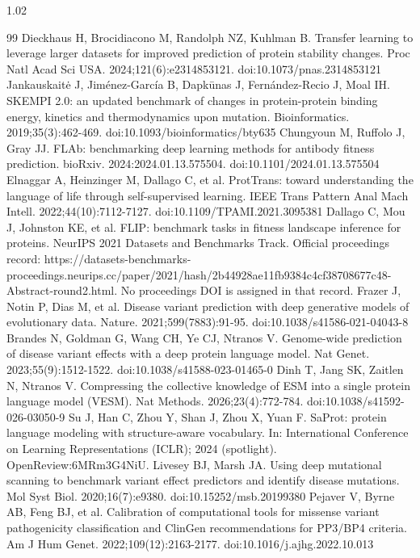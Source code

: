 \documentclass[12pt]{article}
\begin{document}
\begin{spacing}{1.02}
\begin{thebibliography}{99}
 Dieckhaus H, Brocidiacono M, Randolph NZ, Kuhlman B. Transfer learning to leverage larger datasets for improved prediction of protein stability changes. Proc Natl Acad Sci USA. 2024;121(6):e2314853121. doi:10.1073/pnas.2314853121
 Jankauskaitė J, Jiménez-García B, Dapkūnas J, Fernández-Recio J, Moal IH. SKEMPI 2.0: an updated benchmark of changes in protein-protein binding energy, kinetics and thermodynamics upon mutation. Bioinformatics. 2019;35(3):462-469. doi:10.1093/bioinformatics/bty635
 Chungyoun M, Ruffolo J, Gray JJ. FLAb: benchmarking deep learning methods for antibody fitness prediction. bioRxiv. 2024:2024.01.13.575504. doi:10.1101/2024.01.13.575504
 Elnaggar A, Heinzinger M, Dallago C, et al. ProtTrans: toward understanding the language of life through self-supervised learning. IEEE Trans Pattern Anal Mach Intell. 2022;44(10):7112-7127. doi:10.1109/TPAMI.2021.3095381
 Dallago C, Mou J, Johnston KE, et al. FLIP: benchmark tasks in fitness landscape inference for proteins. NeurIPS 2021 Datasets and Benchmarks Track. Official proceedings record: https://datasets-benchmarks-proceedings.neurips.cc/paper/2021/hash/2b44928ae11fb9384c4cf38708677c48-Abstract-round2.html. No proceedings DOI is assigned in that record.
 Frazer J, Notin P, Dias M, et al. Disease variant prediction with deep generative models of evolutionary data. Nature. 2021;599(7883):91-95. doi:10.1038/s41586-021-04043-8
 Brandes N, Goldman G, Wang CH, Ye CJ, Ntranos V. Genome-wide prediction of disease variant effects with a deep protein language model. Nat Genet. 2023;55(9):1512-1522. doi:10.1038/s41588-023-01465-0
 Dinh T, Jang SK, Zaitlen N, Ntranos V. Compressing the collective knowledge of ESM into a single protein language model (VESM). Nat Methods. 2026;23(4):772-784. doi:10.1038/s41592-026-03050-9
 Su J, Han C, Zhou Y, Shan J, Zhou X, Yuan F. SaProt: protein language modeling with structure-aware vocabulary. In: International Conference on Learning Representations (ICLR); 2024 (spotlight). OpenReview:6MRm3G4NiU.
 Livesey BJ, Marsh JA. Using deep mutational scanning to benchmark variant effect predictors and identify disease mutations. Mol Syst Biol. 2020;16(7):e9380. doi:10.15252/msb.20199380
 Pejaver V, Byrne AB, Feng BJ, et al. Calibration of computational tools for missense variant pathogenicity classification and ClinGen recommendations for PP3/BP4 criteria. Am J Hum Genet. 2022;109(12):2163-2177. doi:10.1016/j.ajhg.2022.10.013

\end{thebibliography}
\end{spacing}
\end{document}
